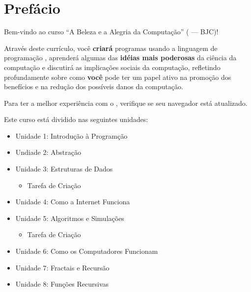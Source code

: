 \chapter{Prefácio}
\label{chap:prefacio}

Bem-vindo ao curso ``A Beleza e a Alegria da Computação'' ( --- BJC)!

Através deste currículo, você \textbf{criará} programas usando a linguagem de
programação \snap, aprenderá algumas das \textbf{idéias mais poderosas} da
ciência da computação e discutirá as implicações sociais da computação,
refletindo profundamente sobre como \textbf{você} pode ter um papel ativo na
promoção dos benefícios e na redução dos possíveis danos da computação.

Para ter a melhor experiência com o \snap, verifique se seu navegador está
atualizado.

Este curso está dividido nas seguintes unidades:

\begin{itemize}[noitemsep]
\item Unidade 1: Introdução à Programção
\item Undiade 2: Abstração
\item Unidade 3: Estruturas de Dados
      \begin{itemize}
      \item Tarefa de Criação
      \end{itemize}
\item Unidade 4: Como a Internet Funciona
\item Unidade 5: Algoritmos e Simulações
      \begin{itemize}
      \item Tarefa de Criação
      \end{itemize}
\item Unidade 6: Como os Computadores Funcionam
\item Unidade 7: Fractais e Recursão
\item Unidade 8: Funções Recursivas
\end{itemize}

